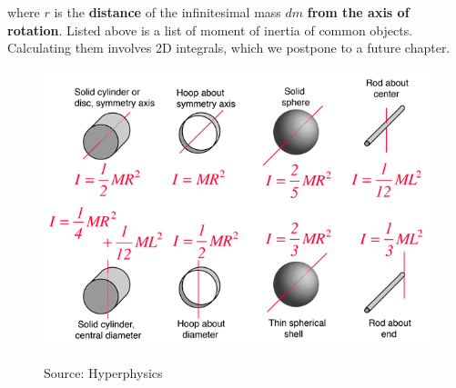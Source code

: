 \documentclass{article}
\begin{document}
where $r$ is the \textbf{distance} of the infinitesimal mass $dm$ \textbf{from the axis of rotation}.
\newpage \clearpage
\noindent Listed above is a list of moment of inertia of common objects. Calculating them involves 2D integrals, which we postpone to a future chapter. 
\begin{figure}[t]
    \centering
\includegraphics[width=1.0\linewidth]{images/commonmoi.png}\\
\caption{Source: Hyperphysics}
\end{figure}
\end{document}
